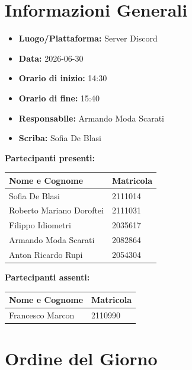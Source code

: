 \section{Informazioni Generali}
\begin{itemize}
    \item \textbf{Luogo/Piattaforma:} Server Discord
    \item \textbf{Data:} 2026-06-30
    \item \textbf{Orario di inizio:} 14:30
    \item \textbf{Orario di fine:} 15:40
    \item \textbf{Responsabile:} Armando Moda Scarati
    \item \textbf{Scriba:} Sofia De Blasi
\end{itemize}

\vspace{0.5cm}
\textbf{Partecipanti presenti:}
\begin{table}[ht]
    \centering
    \renewcommand{\arraystretch}{1.2}
    \begin{tabularx}{\textwidth}{X l}
        \toprule
        \textbf{Nome e Cognome} & \textbf{Matricola} \\
        \midrule
        Sofia De Blasi & 2111014 \\
        Roberto Mariano Doroftei & 2111031 \\
        Filippo Idiometri & 2035617 \\
        Armando Moda Scarati & 2082864 \\
        Anton Ricardo Rupi & 2054304 \\
        \bottomrule
    \end{tabularx}
\end{table}

\vspace{0.5cm}
\textbf{Partecipanti assenti:}
\begin{table}[ht]
    \centering
    \renewcommand{\arraystretch}{1.2}
    \begin{tabularx}{\textwidth}{X l}
        \toprule
        \textbf{Nome e Cognome} & \textbf{Matricola} \\
        \midrule
        Francesco Marcon & 2110990 \\
        \bottomrule
    \end{tabularx}
\end{table}

\section{Ordine del Giorno}


